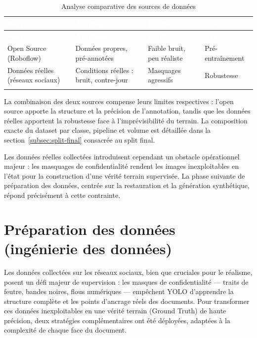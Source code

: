 \renewcommand{\arraystretch}{1.3}
\setlength{\LTleft}{0pt plus 1fill}
\setlength{\LTright}{0pt plus 1fill}
\begin{longtable}{|p{3.5cm}|p{3.5cm}|p{3.5cm}|p{3cm}|}
  \rowcolor{bleu_principal}
  \textcolor{white}{\textbf{Source}} & \textcolor{white}{\textbf{Avantage}} & \textcolor{white}{\textbf{Limite}} & \textcolor{white}{\textbf{Rôle}} \\
  \hline
  \endfirsthead
  \rowcolor{bleu_principal}
  \textcolor{white}{\textbf{Source}} & \textcolor{white}{\textbf{Avantage}} & \textcolor{white}{\textbf{Limite}} & \textcolor{white}{\textbf{Rôle}} \\
  \hline
  \endhead
  Open Source (Roboflow) & Données propres, pré-annotées & Faible bruit, peu réaliste & Pré-entraînement \\ \hline
  Données réelles (réseaux sociaux) & Conditions réelles : bruit, contre-jour & Masquages agressifs & Robustesse \\ \hline
  \caption{Analyse comparative des sources de données}
  \label{tab:ch3-sources-data}
\end{longtable}

La combinaison des deux sources compense leurs limites respectives : l'open source apporte la structure et la précision de l'annotation, tandis que les données réelles apportent la robustesse face à l'imprévisibilité du terrain. La composition exacte du dataset par classe, pipeline et volume est détaillée dans la section~\ref{subsec:split-final} consacrée au split final.

Les données réelles collectées introduisent cependant un obstacle opérationnel majeur : les masquages de confidentialité rendent les images inexploitables en l'état pour la construction d'une vérité terrain supervisée. La phase suivante de préparation des données, centrée sur la restauration et la génération synthétique, répond précisément à cette contrainte.


\section{Préparation des données (ingénierie des données)}
\label{sec:data-preparation}

Les données collectées sur les réseaux sociaux, bien que cruciales pour le réalisme, posent un défi majeur de supervision : les masques de confidentialité --- traits de feutre, bandes noires, flous numériques --- empêchent YOLO d'apprendre la structure complète et les points d'ancrage réels des documents. Pour transformer ces données inexploitables en une vérité terrain (Ground Truth) de haute précision, deux stratégies complémentaires ont été déployées, adaptées à la complexité de chaque face du document.

